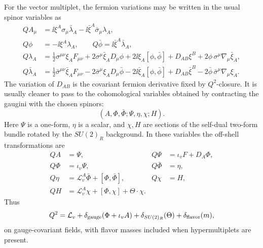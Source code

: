 For the vector multiplet, the fermion variations may be written in the usual
spinor variables as
\begin{align}
  QA_\mu
  &=
  \ii\xi^A\sigma_\mu\bar\lambda_A
  -\ii\bar\xi^A\bar\sigma_\mu\lambda_A,
  \label{eq:s4-vector-susy-A}\\
  Q\phi&=-\ii\xi^A\lambda_A,\qquad
  Q\bar\phi=\ii\bar\xi^A\bar\lambda_A,
  \label{eq:s4-vector-susy-scalars}\\
  Q\lambda_A
  &=
  \frac12\sigma^{\mu\nu}\xi_A F_{\mu\nu}
  +2\sigma^\mu\bar\xi_A D_\mu\phi
  +2\ii\xi_A[\phi,\bar\phi]
  +D_{AB}\xi^B
  +2\phi\,\sigma^\mu\nabla_\mu\bar\xi_A,
  \label{eq:s4-vector-susy-lambda}\\
  Q\bar\lambda_A
  &=
  \frac12\bar\sigma^{\mu\nu}\bar\xi_A F_{\mu\nu}
  -2\bar\sigma^\mu\xi_A D_\mu\bar\phi
  -2\ii\bar\xi_A[\phi,\bar\phi]
  +D_{AB}\bar\xi^B
  -2\bar\phi\,\bar\sigma^\mu\nabla_\mu\xi_A .
  \label{eq:s4-vector-susy-lambdabar}
\end{align}
The variation of \(D_{AB}\) is the covariant fermion derivative fixed by
\(Q^2\)-closure.  It is usually cleaner to pass to the cohomological variables
obtained by contracting the gaugini with the chosen spinors:
\[
  (A,\Phi,\bar\Phi;\Psi,\eta,\chi;H).
\]
Here \(\Psi\) is a one-form, \(\eta\) is a scalar, and \(\chi,H\) are sections
of the self-dual two-form bundle rotated by the \(SU(2)_R\) background.  In
these variables the off-shell transformations are
\begin{equation}
\begin{aligned}
  QA &= \Psi,&
  Q\Psi &= \iota_v F+D_A\Phi,\\
  Q\Phi &= \iota_v\Psi,&
  Q\bar\Phi &= \eta,\\
  Q\eta &= \mathcal L_v^A\bar\Phi+[\Phi,\bar\Phi],&
  Q\chi &= H,\\
  QH &= \mathcal L_v^A\chi+[\Phi,\chi]+\Theta\cdot\chi .
\end{aligned}
  \label{eq:s4-cohomological-q-transformations}
\end{equation}
Thus
\begin{equation}
  Q^2
  =
  \mathcal L_v+\delta_{\rm gauge}(\Phi+\iota_v A)
  +\delta_{SU(2)_R}(\Theta)+\delta_{\rm flavor}(m),
  \label{eq:s4-q-square-data}
\end{equation}
on gauge-covariant fields, with flavor masses included when hypermultiplets are
present.

